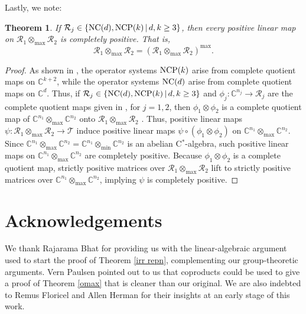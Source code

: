\documentclass{amsart}
\newtheorem{theorem}{Theorem}[section]
\theoremstyle{definition}
\theoremstyle{remark}
\newcommand\osr{{\mathcal R}}
\newcommand\ost{{\mathcal T}}
\newcommand\omin{\otimes_{\textrm{min}}}
\newcommand\omax{\otimes_{\textrm{max}}}
\numberwithin{equation}{section}
\begin{document}
 Lastly, we note:
 
 \begin{theorem}\label{acp tp}
 If $\osr_j\in\{\mbox{\textrm{NC}}(d),\mbox{\textrm{NCP}}(k)\,|\,d,k\geq 3\}$, then every positive linear map on $\osr_1\omax\osr_2$
 is completely positive. That is, 
 \[
 \osr_1\omax\osr_2 = (\osr_1\omax\osr_2)^{\textrm{max}}.
 \]
 \end{theorem}
 
 \begin{proof} 
 As shown in \cite{farenick--kavruk--paulsen--todorov2014,farenick--kavruk--paulsen--todorov2018}, 
 the operator systems $\mbox{\textrm{NCP}}(k)$ arise from complete quotient maps on $\mathbb C^{k+2}$,
 while the operator systems $\mbox{\textrm{NC}}(d)$ arise from complete quotient maps on $\mathbb C^{d}$. Thus, if 
 $\osr_j\in\{\mbox{\textrm{NC}}(d),\mbox{\textrm{NCP}}(k)\,|\,d,k\geq 3\}$ and $\phi_j:\mathbb C^{n_j}\rightarrow\osr_j$ are the complete quotient maps
 given in \cite{farenick--kavruk--paulsen--todorov2014,farenick--kavruk--paulsen--todorov2018}, for $j=1,2$,
 then $\phi_1\otimes\phi_2$ is a complete
 quotient map of $\mathbb C^{n_1}\omax\mathbb C^{n_2}$ onto $\osr_1\omax\osr_2$ \cite[Corollary 1.13]{farenick--paulsen2012}.
 Thus, positive linear maps $\psi:\osr_1\omax\osr_2\rightarrow\ost$ induce positive linear maps 
 $\psi\circ(\phi_1\otimes\phi_2)$ on $\mathbb C^{n_1}\omax\mathbb C^{n_2}$. Since
 $\mathbb C^{n_1}\omax\mathbb C^{n_2}=\mathbb C^{n_1}\omin\mathbb C^{n_2}$ is an abelian C$^*$-algebra, such positive
 linear maps on $\mathbb C^{n_1}\omax\mathbb C^{n_2}$ are completely positive. Because $\phi_1\otimes\phi_2$ is a complete quotient map,
 strictly positive matrices over $\osr_1\omax\osr_2$ lift to strictly positive matrices over $\mathbb C^{n_1}\omax\mathbb C^{n_2}$, implying
$\psi$ is completely positive.
 \end{proof}
 



\section*{Acknowledgements}
We thank Rajarama Bhat for providing us with the
linear-algebraic argument used to start the proof of Theorem \ref{irr repn}, 
complementing our group-theoretic arguments. Vern Paulsen pointed out to us
that coproducts could be used to give a proof of Theorem \ref{omax} that is cleaner than our original. 
We are also indebted to Remus Floricel and Allen Herman for their insights at an early stage of this work.
 
\end{document}
